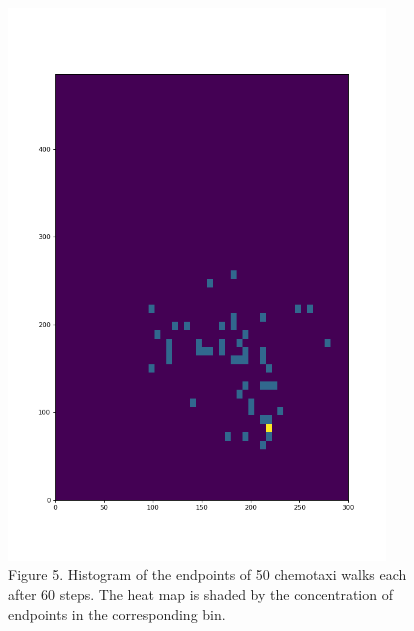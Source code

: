 \documentclass{article}
\begin{document}
\begin{figure}[h]
\centering
\includegraphics[width=10cm,keepaspectratio]{images/chemotaxi-histogram-small.png}
\captionsetup{labelformat=empty} \caption{Figure 5. Histogram of the endpoints of 50 chemotaxi walks each after 60 steps. The heat map is shaded by the concentration of endpoints in the corresponding bin.}
\end{figure}
\end{document}
